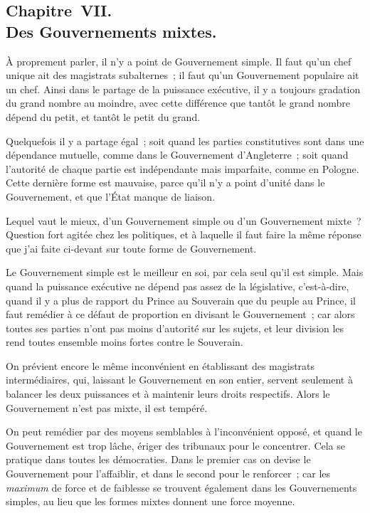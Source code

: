 \documentclass[french,twoside]{book} %
\begin{document}
\subsection[{Chapitre VII. Des Gouvernements mixtes.}]{Chapitre VII. \\
Des Gouvernements mixtes.}
\noindent À proprement parler, il n’y a point de Gouvernement simple. Il faut qu’un chef unique ait des magistrats subalternes ; il faut qu’un Gouvernement populaire ait un chef. Ainsi dans le partage de la puissance exécutive, il y a toujours gradation du grand nombre au moindre, avec cette différence que tantôt le grand nombre dépend du petit, et tantôt le petit du grand.\par
Quelquefois il y a partage égal ; soit quand les parties constitutives sont dans une dépendance mutuelle, comme dans le Gouvernement d’Angleterre ; soit quand l’autorité de chaque partie est indépendante mais imparfaite, comme en Pologne. Cette dernière forme est mauvaise, parce qu’il n’y a point d’unité dans le Gouvernement, et que l’État manque de liaison.\par
Lequel vaut le mieux, d’un Gouvernement simple ou d’un Gouvernement mixte ? Question fort agitée chez les politiques, et à laquelle il faut faire la même réponse que j’ai faite ci-devant sur toute forme de Gouvernement.\par
Le Gouvernement simple est le meilleur en soi, par cela seul qu’il est simple. Mais quand la puissance exécutive ne dépend pas assez de la législative, c’est-à-dire, quand il y a plus de rapport du Prince au Souverain que du peuple au Prince, il faut remédier à ce défaut de proportion en divisant le Gouvernement ; car alors toutes ses parties n’ont pas moins d’autorité sur les sujets, et leur division les rend toutes ensemble moins fortes contre le Souverain.\par
On prévient encore le même inconvénient en établissant des magistrats intermédiaires, qui, laissant le Gouvernement en son entier, servent seulement à balancer les deux puissances et à maintenir leurs droits respectifs. Alors le Gouvernement n’est pas mixte, il est tempéré.\par
On peut remédier par des moyens semblables à l’inconvénient opposé, et quand le Gouvernement est trop lâche, ériger des tribunaux pour le concentrer. Cela se pratique dans toutes les démocraties. Dans le premier cas on devise le Gouvernement pour l’affaiblir, et dans le second pour le renforcer ; car les {\itshape maximum} de force et de faiblesse se trouvent également dans les Gouvernements simples, au lieu que les formes mixtes donnent une force moyenne.
\end{document}
